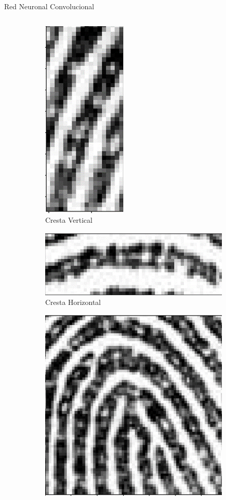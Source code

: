 \documentclass[12pt,aspectratio=169]{beamer}
\begin{document}
\begin{frame}{Red Neuronal Convolucional}
\begin{columns}[c]
\begin{itemize}
                \begin{figure}[h]
                    \begin{subfigure}{0.21\textwidth}
                        \centering
                        \includegraphics[scale=0.1]{figs/fll_0.png}  
                        \caption{Cresta Vertical}
                    \end{subfigure}
                    \begin{subfigure}{0.21\textwidth}
                        \centering
                        \includegraphics[scale=0.1]{figs/fll_1.png}  
                        \caption{Cresta Horizontal}
                    \end{subfigure}
                    \begin{subfigure}{0.21\textwidth}
                        \centering
                        \includegraphics[scale=0.1]{figs/fhl_0.png}  

\end{subfigure}
\end{figure}
\end{itemize}
\end{columns}
\end{frame}
\end{document}

